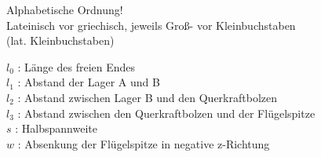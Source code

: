 
Alphabetische Ordnung!\\ 
Lateinisch vor griechisch, jeweils Groß- vor Kleinbuchstaben\\
(lat. Kleinbuchstaben)\\

\noindent 

\noindent $l_{0}$ : Länge des freien Endes\\
$l_{1}$ : Abstand der Lager A und B\\
$l_{2}$ : Abstand zwischen Lager B und den Querkraftbolzen\\
\noindent $l_{3}$ : Abstand zwischen den Querkraftbolzen und der Flügelspitze\\
$ s $ : Halbspannweite\\
$ w $ : Absenkung der Flügelspitze in negative z-Richtung



